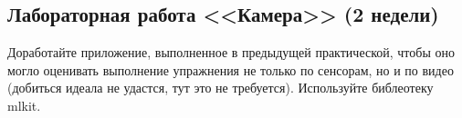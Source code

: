 \subsection{Лабораторная работа <<Камера>> (2 недели)}

Доработайте приложение, выполненное в предыдущей практической, чтобы оно могло оценивать выполнение упражнения не только по 
сенсорам, но и по видео (добиться идеала не удастся, тут это не требуется). Используйте библеотеку mlkit.
